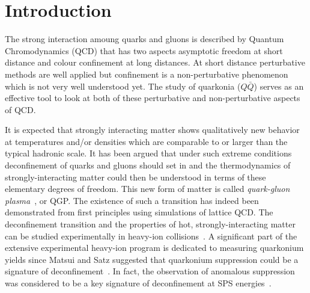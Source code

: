 \section{Introduction}
\label{sec:Introduction}


The strong interaction amoung quarks and gluons is described by
Quantum Chromodynamics (QCD) that has two aspects asymptotic freedom at short distance
and colour confinement at long distances.
At short distance perturbative methods are well applied but confinement is a
non-perturbative phenomenon which is not very well understood yet. 
The study of quarkonia ($Q\bar{Q}$) serves as an effective 
tool to look at  both of these perturbative and non-perturbative aspects of QCD.

It is expected that strongly interacting matter shows qualitatively
new behavior at temperatures and/or densities which are
comparable to or larger than the typical hadronic scale.
It has been argued that under such extreme conditions
deconfinement of quarks and gluons should set in and the 
thermodynamics of strongly-interacting matter could then
be understood in terms of these elementary degrees of freedom.
This new form of matter is called
{\em quark-gluon plasma}~\cite{Shuryak:1980tp,Satz:2011wf}, or QGP.
The existence of such a transition has indeed been demonstrated 
from first principles using simulations of lattice QCD.
The deconfinement transition and the properties of hot, strongly-interacting 
matter can be studied experimentally in heavy-ion collisions~\cite{Satz:2000bn}. 
A significant part of the extensive experimental heavy-ion
program is dedicated to measuring quarkonium yields since Matsui and Satz
suggested that quarkonium suppression could be a signature of 
deconfinement~\cite{Matsui:1986dk}.
In fact, the observation of anomalous suppression was considered to be
a key signature of deconfinement at SPS energies~\cite{Kluberg:2005yh}.

